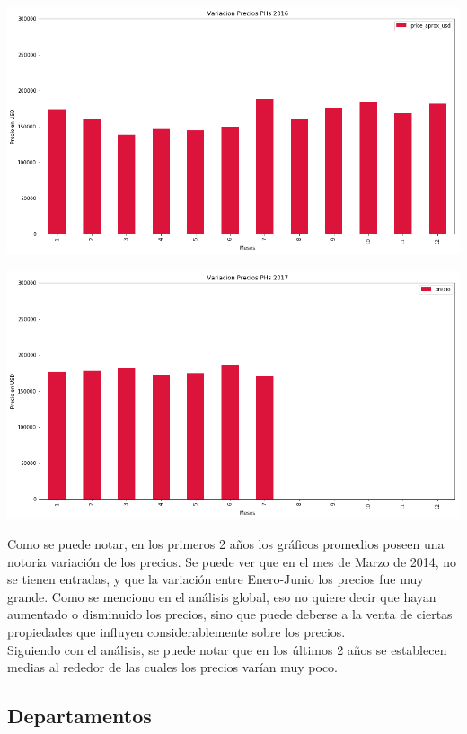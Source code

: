\documentclass[a4paper, 10pt]{article}
\begin{document}
			\begin{center}
   		    		\includegraphics[width=\textwidth]{images/vPH2016}
			\end{center}

			\begin{center}
   		    		\includegraphics[width=\textwidth]{images/vPH2017}
			\end{center}

			Como se puede notar, en los primeros 2 años los gráficos promedios poseen una notoria variación de los precios. Se puede ver que en el mes de Marzo de 2014, no se tienen entradas, y que la variación entre Enero-Junio los precios fue muy grande. Como se menciono en el análisis global, eso no quiere decir que hayan aumentado o disminuido los precios, sino que puede deberse a la venta de ciertas propiedades que influyen considerablemente sobre los precios.
			\\
			Siguiendo con el análisis, se puede notar que en los últimos 2 años se establecen medias al rededor de las cuales los precios varían muy poco.


			\subsection{Departamentos}
\end{document}
